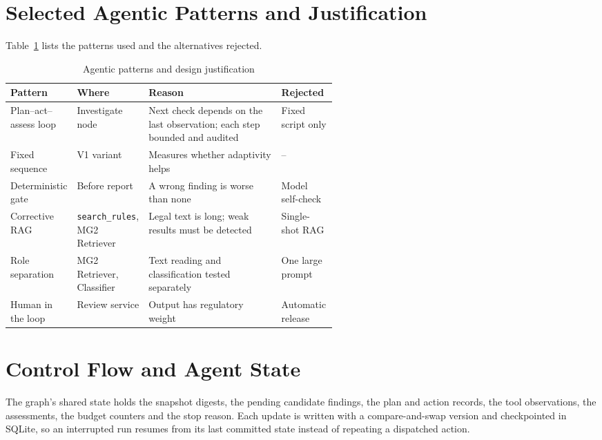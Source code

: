 \section{Selected Agentic Patterns and Justification}
Table~\ref{tab:patterns} lists the patterns used and the alternatives rejected.

\begin{table}[htbp]
\centering
\caption{Agentic patterns and design justification}
\label{tab:patterns}
\small
\begin{tabularx}{\linewidth}{@{}>{\raggedright\arraybackslash}p{0.19\linewidth} >{\raggedright\arraybackslash}p{0.19\linewidth} >{\raggedright\arraybackslash}X >{\raggedright\arraybackslash}p{0.17\linewidth}@{}}
\toprule
\textbf{Pattern} & \textbf{Where} & \textbf{Reason} & \textbf{Rejected} \\ \midrule
Plan--act--assess loop & Investigate node & Next check depends on the last observation; each step bounded and audited & Fixed script only \\
Fixed sequence & V1 variant & Measures whether adaptivity helps & -- \\
Deterministic gate & Before report & A wrong finding is worse than none & Model self-check \\
Corrective RAG & \texttt{search\_rules}, MG2 Retriever & Legal text is long; weak results must be detected & Single-shot RAG \\
Role separation & MG2 Retriever, Classifier & Text reading and classification tested separately & One large prompt \\
Human in the loop & Review service & Output has regulatory weight & Automatic release \\
\bottomrule
\end{tabularx}
\end{table}

\section{Control Flow and Agent State}
The graph's shared state holds the snapshot digests, the pending candidate findings, the plan and
action records, the tool observations, the assessments, the budget counters and the stop reason.
Each update is written with a compare-and-swap version and checkpointed in SQLite, so an
interrupted run resumes from its last committed state instead of repeating a dispatched action.

